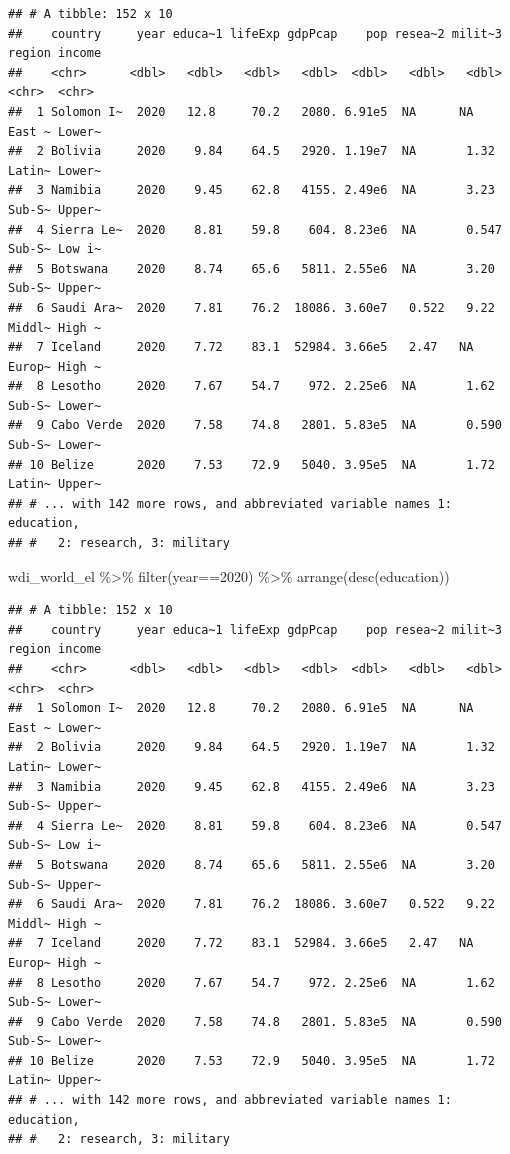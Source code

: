 \documentclass[
]{article}
\newenvironment{Shaded}{\begin{snugshade}}{\end{snugshade}}
\newcommand{\DecValTok}[1]{\textcolor[rgb]{0.00,0.00,0.81}{#1}}
\newcommand{\FunctionTok}[1]{\textcolor[rgb]{0.00,0.00,0.00}{#1}}
\newcommand{\NormalTok}[1]{#1}
\newcommand{\SpecialCharTok}[1]{\textcolor[rgb]{0.00,0.00,0.00}{#1}}
\begin{document}
\begin{verbatim}
## # A tibble: 152 x 10
##    country     year educa~1 lifeExp gdpPcap    pop resea~2 milit~3 region income
##    <chr>      <dbl>   <dbl>   <dbl>   <dbl>  <dbl>   <dbl>   <dbl> <chr>  <chr> 
##  1 Solomon I~  2020   12.8     70.2   2080. 6.91e5  NA      NA     East ~ Lower~
##  2 Bolivia     2020    9.84    64.5   2920. 1.19e7  NA       1.32  Latin~ Lower~
##  3 Namibia     2020    9.45    62.8   4155. 2.49e6  NA       3.23  Sub-S~ Upper~
##  4 Sierra Le~  2020    8.81    59.8    604. 8.23e6  NA       0.547 Sub-S~ Low i~
##  5 Botswana    2020    8.74    65.6   5811. 2.55e6  NA       3.20  Sub-S~ Upper~
##  6 Saudi Ara~  2020    7.81    76.2  18086. 3.60e7   0.522   9.22  Middl~ High ~
##  7 Iceland     2020    7.72    83.1  52984. 3.66e5   2.47   NA     Europ~ High ~
##  8 Lesotho     2020    7.67    54.7    972. 2.25e6  NA       1.62  Sub-S~ Lower~
##  9 Cabo Verde  2020    7.58    74.8   2801. 5.83e5  NA       0.590 Sub-S~ Lower~
## 10 Belize      2020    7.53    72.9   5040. 3.95e5  NA       1.72  Latin~ Upper~
## # ... with 142 more rows, and abbreviated variable names 1: education,
## #   2: research, 3: military
\end{verbatim}

\begin{Shaded}
\begin{Highlighting}[]
\NormalTok{wdi\_world\_el }\SpecialCharTok{\%\textgreater{}\%} \FunctionTok{filter}\NormalTok{(year}\SpecialCharTok{==}\DecValTok{2020}\NormalTok{) }\SpecialCharTok{\%\textgreater{}\%} \FunctionTok{arrange}\NormalTok{(}\FunctionTok{desc}\NormalTok{(education))}
\end{Highlighting}
\end{Shaded}

\begin{verbatim}
## # A tibble: 152 x 10
##    country     year educa~1 lifeExp gdpPcap    pop resea~2 milit~3 region income
##    <chr>      <dbl>   <dbl>   <dbl>   <dbl>  <dbl>   <dbl>   <dbl> <chr>  <chr> 
##  1 Solomon I~  2020   12.8     70.2   2080. 6.91e5  NA      NA     East ~ Lower~
##  2 Bolivia     2020    9.84    64.5   2920. 1.19e7  NA       1.32  Latin~ Lower~
##  3 Namibia     2020    9.45    62.8   4155. 2.49e6  NA       3.23  Sub-S~ Upper~
##  4 Sierra Le~  2020    8.81    59.8    604. 8.23e6  NA       0.547 Sub-S~ Low i~
##  5 Botswana    2020    8.74    65.6   5811. 2.55e6  NA       3.20  Sub-S~ Upper~
##  6 Saudi Ara~  2020    7.81    76.2  18086. 3.60e7   0.522   9.22  Middl~ High ~
##  7 Iceland     2020    7.72    83.1  52984. 3.66e5   2.47   NA     Europ~ High ~
##  8 Lesotho     2020    7.67    54.7    972. 2.25e6  NA       1.62  Sub-S~ Lower~
##  9 Cabo Verde  2020    7.58    74.8   2801. 5.83e5  NA       0.590 Sub-S~ Lower~
## 10 Belize      2020    7.53    72.9   5040. 3.95e5  NA       1.72  Latin~ Upper~
## # ... with 142 more rows, and abbreviated variable names 1: education,
## #   2: research, 3: military
\end{verbatim}
\end{document}
